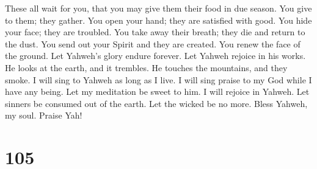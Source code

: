  These all wait for you, that you may give them their
food in due season.  You give to them; they gather. You
open your hand; they are satisfied with good.  You hide
your face; they are troubled. You take away their breath; they die and
return to the dust.  You send out your Spirit and they
are created. You renew the face of the ground.  Let
Yahweh's glory endure forever. Let Yahweh rejoice in his works.
 He looks at the earth, and it trembles. He touches the
mountains, and they smoke.  I will sing to Yahweh as long
as I live. I will sing praise to my God while I have any being.
 Let my meditation be sweet to him. I will rejoice in
Yahweh.  Let sinners be consumed out of the earth. Let
the wicked be no more. Bless Yahweh, my soul. Praise Yah!

\hypertarget{section-97}{%
\section{105}\label{section-97}}

